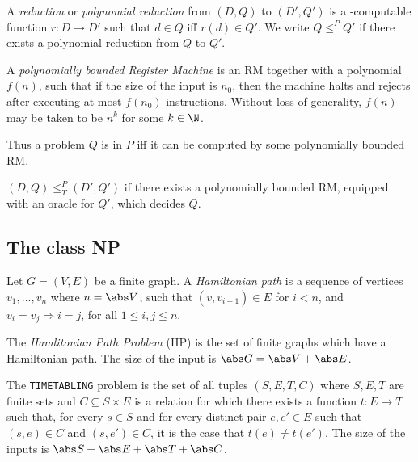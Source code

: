 \documentclass{article}
\begin{document}
\begin{definition*}
	A \ptime \emph{reduction} or \emph{polynomial reduction} from $(D,Q)$ to $(D',Q')$ is
	a \ptime-computable function $r:D\to D'$ such that $d\in Q$ iff $r(d)\in Q'$.
	We write $Q\leq^P Q'$ if there exists a polynomial reduction from $Q$ to $Q'$.
\end{definition*}

\begin{definition*}
	A \emph{polynomially bounded Register Machine} is an RM together with a polynomial $f(n)$,
	such that if the size of the input is $n_0$, then the machine halts and rejects after
	executing at most $f(n_0)$ instructions. Without loss of generality, $f(n)$ may be taken to be
	$n^k$ for some $k\in\N$.

	Thus a problem $Q$ is in $P$ iff it can be computed by some polynomially bounded RM.
\end{definition*}

\begin{definition*}
	$(D,Q)\leq^P_T (D',Q')$ if there exists a polynomially bounded RM, equipped with an oracle
	for $Q'$, which decides $Q$.
\end{definition*}

\subsection{The class NP}

\begin{definition*}
	Let $G=(V,E)$ be a finite graph. A \emph{Hamiltonian path} is a sequence of vertices
	$v_1,...,v_n$ where $n=\abs V$, such that $(v,v_{i+1})\in E$ for $i<n$, and $v_i=v_j
		\Rightarrow i=j$, for all $1\leq i,j\leq n$.

	The \emph{Hamlitonian Path Problem} (HP) is the set of finite graphs which have a Hamiltonian
	path. The size of the input is $\abs G = \abs V + \abs E$.
\end{definition*}

\begin{definition*}[Timetabling]
	The \texttt{TIMETABLING} problem is the set of all tuples $(S,E,T,C)$ where $S,E,T$ are finite
	sets and $C\subseteq S\times E$ is a relation for which there exists a function $t:E\to T$
	such that, for every $s\in S$ and for every distinct pair $e,e'\in E$ such that $(s,e)\in C$
	and $(s,e')\in C$, it is the case that $t(e)\not=t(e')$.
	The size of the inputs is $\abs S + \abs E + \abs T + \abs C$.
\end{definition*}
\end{document}
